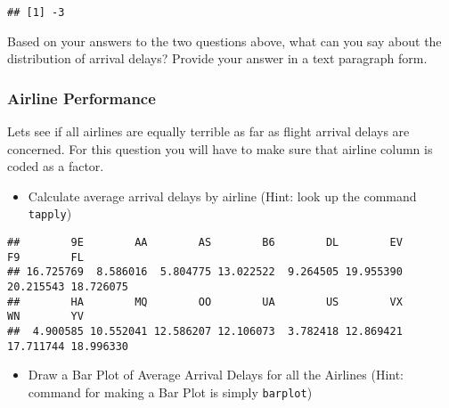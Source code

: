 \documentclass[
]{article}
\newenvironment{Shaded}{\begin{snugshade}}{\end{snugshade}}
\newcommand{\DataTypeTok}[1]{\textcolor[rgb]{0.13,0.29,0.53}{#1}}
\newcommand{\KeywordTok}[1]{\textcolor[rgb]{0.13,0.29,0.53}{\textbf{#1}}}
\newcommand{\NormalTok}[1]{#1}
\newcommand{\OperatorTok}[1]{\textcolor[rgb]{0.81,0.36,0.00}{\textbf{#1}}}
\newcommand{\OtherTok}[1]{\textcolor[rgb]{0.56,0.35,0.01}{#1}}
\newcommand{\StringTok}[1]{\textcolor[rgb]{0.31,0.60,0.02}{#1}}
\providecommand{\tightlist}{%
  \setlength{\itemsep}{0pt}\setlength{\parskip}{0pt}}
\begin{document}
\begin{Shaded}
\end{Shaded}

\begin{verbatim}
## [1] -3
\end{verbatim}

Based on your answers to the two questions above, what can you say about
the distribution of arrival delays? Provide your answer in a text
paragraph form.

\hypertarget{airline-performance}{%
\subsubsection{Airline Performance}\label{airline-performance}}

Lets see if all airlines are equally terrible as far as flight arrival
delays are concerned. For this question you will have to make sure that
airline column is coded as a factor.

\begin{itemize}
\tightlist
\item
  Calculate average arrival delays by airline (Hint: look up the command
  \texttt{tapply})
\end{itemize}

\begin{Shaded}
\end{Shaded}

\begin{verbatim}
##        9E        AA        AS        B6        DL        EV        F9        FL 
## 16.725769  8.586016  5.804775 13.022522  9.264505 19.955390 20.215543 18.726075 
##        HA        MQ        OO        UA        US        VX        WN        YV 
##  4.900585 10.552041 12.586207 12.106073  3.782418 12.869421 17.711744 18.996330
\end{verbatim}

\begin{itemize}
\tightlist
\item
  Draw a Bar Plot of Average Arrival Delays for all the Airlines (Hint:
  command for making a Bar Plot is simply \texttt{barplot})
\end{itemize}
\end{document}
